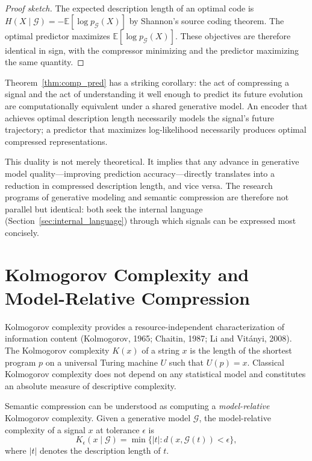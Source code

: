 \documentclass[11pt,a4paper]{article}
\theoremstyle{definition}
\theoremstyle{remark}
\begin{document}
\begin{proof}[Proof sketch]
The expected description length of an optimal code is $H(X \mid \mathcal{G}) = -\mathbb{E}[\log p_\mathcal{G}(X)]$ by Shannon's source coding theorem. The optimal predictor maximizes $\mathbb{E}[\log p_\mathcal{G}(X)]$. These objectives are therefore identical in sign, with the compressor minimizing and the predictor maximizing the same quantity.
\end{proof}

Theorem~\ref{thm:comp_pred} has a striking corollary: the act of compressing a signal and the act of understanding it well enough to predict its future evolution are computationally equivalent under a shared generative model. An encoder that achieves optimal description length necessarily models the signal's future trajectory; a predictor that maximizes log-likelihood necessarily produces optimal compressed representations.

This duality is not merely theoretical. It implies that any advance in generative model quality---improving prediction accuracy---directly translates into a reduction in compressed description length, and vice versa. The research programs of generative modeling and semantic compression are therefore not parallel but identical: both seek the internal language (Section~\ref{sec:internal_language}) through which signals can be expressed most concisely.

\section{Kolmogorov Complexity and Model-Relative Compression}
\label{sec:kolmogorov}

Kolmogorov complexity provides a resource-independent characterization of information content (Kolmogorov, 1965; Chaitin, 1987; Li and Vit\'{a}nyi, 2008). The Kolmogorov complexity $K(x)$ of a string $x$ is the length of the shortest program $p$ on a universal Turing machine $U$ such that $U(p) = x$. Classical Kolmogorov complexity does not depend on any statistical model and constitutes an absolute measure of descriptive complexity.

Semantic compression can be understood as computing a \emph{model-relative} Kolmogorov complexity. Given a generative model $\mathcal{G}$, the model-relative complexity of a signal $x$ at tolerance $\epsilon$ is
\[
K_\epsilon(x \mid \mathcal{G}) = \min \{ |t| : d(x, \mathcal{G}(t)) < \epsilon \},
\]
where $|t|$ denotes the description length of $t$.
\end{document}
